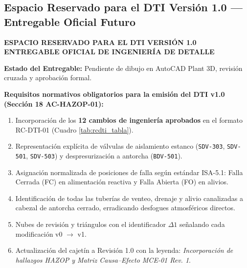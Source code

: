 \documentclass[10pt,letterpaper]{article}
\begin{document}
\begin{landscape}
\thispagestyle{fancy}
\subsection{Espacio Reservado para el DTI Versión 1.0 --- Entregable Oficial Futuro}
\begin{tcolorbox}[colframe=navyblue,colback=boxbg,arc=4mm,boxrule=1.5pt,height=0.82\textheight,valign=center]
    \centering
    {\huge \textbf{\color{navyblue} ESPACIO RESERVADO PARA EL DTI VERSIÓN 1.0}}\\[0.25cm]
    {\LARGE \textbf{\color{forestgreen} ENTREGABLE OFICIAL DE INGENIERÍA DE DETALLE}}\\[0.5cm]
    \begin{tcolorbox}[colframe=forestgreen,colback=white,arc=2mm,boxrule=1pt,width=0.75\linewidth]
        \centering\large
        \textbf{\color{forestgreen} Estado del Entregable:} Pendiente de dibujo en AutoCAD Plant 3D, revisión cruzada y aprobación formal.
    \end{tcolorbox}
    \vspace{0.6cm}
    \begin{minipage}{0.85\linewidth}
        \small
        \textbf{Requisitos normativos obligatorios para la emisión del DTI v1.0 (Sección 18 AC-HAZOP-01):}
        \begin{enumerate}
            \item Incorporación de los \textbf{12 cambios de ingeniería aprobados} en el formato RC-DTI-01 (Cuadro \ref{tab:rcdti_tabla}).
            \item Representación explícita de válvulas de aislamiento estanco (\texttt{SDV-303}, \texttt{SDV-501}, \texttt{SDV-503}) y despresurización a antorcha (\texttt{BDV-501}).
            \item Asignación normalizada de posiciones de falla según estándar ISA-5.1: Falla Cerrada (FC) en alimentación reactiva y Falla Abierta (FO) en alivios.
            \item Identificación de todas las tuberías de venteo, drenaje y alivio canalizadas a cabezal de antorcha cerrado, erradicando desfogues atmosféricos directos.
            \item Nubes de revisión y triángulos con el identificador $\Delta 1$ señalando cada modificación v0 $\to$ v1.
            \item Actualización del cajetín a Revisión 1.0 con la leyenda: \textit{Incorporación de hallazgos HAZOP y Matriz Causa--Efecto MCE-01 Rev. 1}.
        \end{enumerate}
    \end{minipage}
\end{tcolorbox}
\end{landscape}
\newpage
\end{document}
